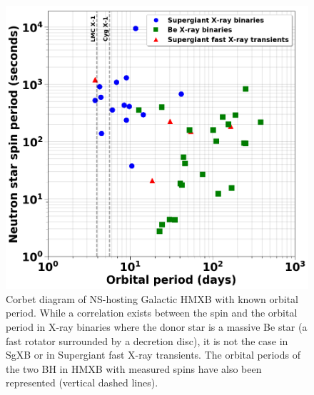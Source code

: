 \documentclass[letterpaper,12pt,onecolumn]{article}
\makeatletter
\newcommand{\sgx}{SgXB\xspace}
\newcommand*{\hmxb}{HMXB\@\xspace}
\newcommand*{\ns}{NS\@\xspace}
\newcommand*{\bh}{BH\@\xspace}
\makeatother
\begin{document}

\begin{figure}[!b]
\centering
\includegraphics[width=0.6\columnwidth]{Figures/corbet_diag.png}
\caption{Corbet diagram of \ns-hosting Galactic \hmxb with known orbital period. While a correlation exists between the spin and the orbital period in X-ray binaries where the donor star is a massive Be star (a fast rotator surrounded by a decretion disc), it is not the case in \sgx or in Supergiant fast X-ray transients. The orbital periods of the two \bh in \hmxb with measured spins have also been represented (vertical dashed lines).}
\label{fig:spin}
\end{figure} 
\end{document}
